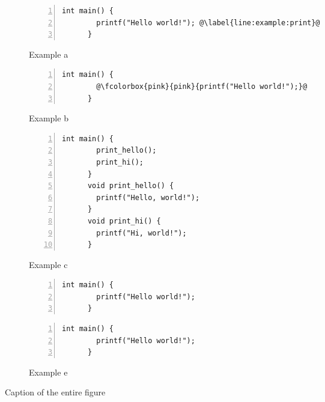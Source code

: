 \begin{figure*}[h]
  \begin{subfigure}{0.48\textwidth}
    \begin{lstlisting}[numbers=left,xleftmargin=2em]
      int main() {
        printf("Hello world!"); @\label{line:example:print}@
      }
    \end{lstlisting}
    \caption{Example a}
    \label{code:sample:a}
  \end{subfigure}
  \begin{subfigure}{0.48\textwidth}
    \begin{lstlisting}[numbers=left,xleftmargin=2em]
      int main() {
        @\fcolorbox{pink}{pink}{printf("Hello world!");}@
      }
    \end{lstlisting}
    \caption{Example b}
    \label{code:sample:b}
  \end{subfigure}
  \begin{subfigure}{0.48\textwidth}
    \begin{lstlisting}[numbers=left,xleftmargin=2em]
      int main() {
        print_hello();
        print_hi();
      }
      void print_hello() {
        printf("Hello, world!");
      }
      void print_hi() {
        printf("Hi, world!");
      }
    \end{lstlisting}
    \caption{Example c}
    \label{code:sample:c}
  \end{subfigure}
  \hfill
  \begin{subfigure}{0.48\textwidth}
    \begin{lstlisting}[numbers=left,xleftmargin=2em]
      int main() {
        printf("Hello world!");
      }
    \end{lstlisting}
    \caption{Example d}
    \label{code:sample:d}
    \begin{lstlisting}[numbers=left,xleftmargin=2em]
      int main() {
        printf("Hello world!");
      }
    \end{lstlisting}
    \caption{Example e}
    \label{code:sample:e}
  \end{subfigure}
  \caption{Caption of the entire figure}
  \label{fig:example}
\end{figure*}
